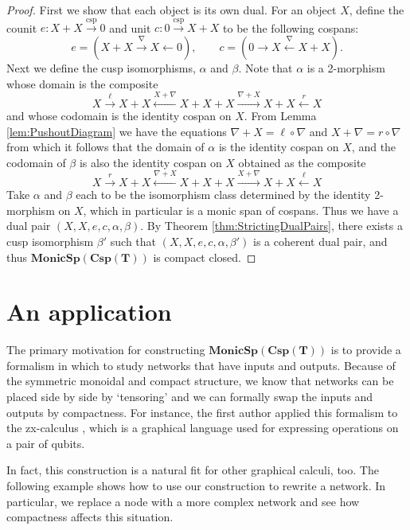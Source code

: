 \documentclass{tac}
\newcommand{\from}{\colon}
\newcommand{\xto}[1]{\xrightarrow{#1}}
\newcommand{\tocospan}{\xrightarrow{\mathrm{csp}}}
\newcommand{\bimonspcsp}[1]{\mathbf{MonicSp(Csp(#1))}}
\theoremstyle{remark}
\theoremstyle{definition}
\begin{document}
\begin{proof}
	First we show that each object is its own dual. 
	For an object $X$,  
	define the counit 
		$e \from X + X \tocospan 0$ 
	and unit 
		$c \from 0 \tocospan X+X$ 
	to be the following cospans:
	\[
		e = (X+X \xto{\nabla} X \gets 0), 
		\quad \quad 
		c = (0 \to X \xleftarrow{\nabla} X+X).
	\]
	Next we define the cusp isomorphisms, 
		$\alpha$ and $\beta$.
	Note that $\alpha$ is a 2-morphism 
	whose domain is the composite 
	\[
		X \xto{\ell}
		X+X \xleftarrow{X+\nabla}
		X+X+X \xto{\nabla +X}
		X+X \xleftarrow{r}
		X
	\]
	and whose codomain is the identity cospan on $X$.  
	From Lemma \ref{lem:PushoutDiagram} 
	we have the equations
		$\nabla+X = \ell \circ \nabla$ 
	and 
		$X + \nabla = r \circ \nabla$ 
	from which it follows that the domain of $\alpha$ is 
	the identity cospan on $X$, and  
	the codomain of $\beta$ is also 
	the identity cospan on $X$
	obtained as the composite 
	\[
		X \xto{r}
		X+X \xleftarrow{\nabla+X}
		X+X+X \xto{X+\nabla}
		X+X \xleftarrow{\ell}
		X
	\]
	Take $\alpha$ and $\beta$ each 
	to be the isomorphism class determined by the identity 2-morphism on $X$, which in particular is a monic span of cospans.
	Thus we have a dual pair 
		$(X,X,e,c,\alpha,\beta)$. 
	By Theorem 
		\ref{thm:StrictingDualPairs}, 
	there exists a cusp isomorphism $\beta'$ 
	such that 
		$(X,X,e,c,\alpha,\beta')$ 
	is a coherent dual pair, and thus $\mathbf{MonicSp(Csp(T))}$ is compact closed.  
\end{proof}

\section{An application} %
\label{sec:Applications}

The primary motivation for constructing $\bimonspcsp{T}$
is to provide a formalism in which to study networks
that have inputs and outputs.
Because of the symmetric monoidal and compact structure,
we know that networks can be placed side by side 
by `tensoring' and we can formally swap the inputs
and outputs by compactness. 
For instance, the first author applied this formalism
to the zx-calculus \cite{Cic_zx}, which is a graphical
language used for expressing operations
on a pair of qubits.

In fact, this construction is a natural 
fit for other graphical calculi, too. 
The following example shows how to use 
our construction to rewrite a network. 
In particular, we replace
a node with a more complex network
and see how compactness affects
this situation.  
\end{document}
